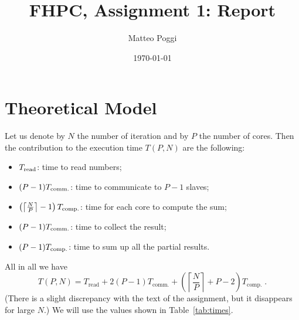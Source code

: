 \documentclass[11pt,a4paper]{article}
\title{FHPC, Assignment 1: Report}
\author{Matteo Poggi}
\date{\today}
\renewcommand{\l}{\left}
\renewcommand{\r}{\right}
\newcommand{\f}{\frac}
\newcommand{\mr}{\ensuremath{\mathrm}}
\numberwithin{equation}{section}
\begin{document}
\maketitle

\section{Theoretical Model}
Let us denote by $N$ the number of iteration and by $P$ the number of cores. Then the contribution to the execution time $T(P, N)$ are the following:
\begin{itemize}
    \item $T_{\mr{read}}$: time to read numbers;
    \item $(P-1)T_{\mr{comm.}}$: time to communicate to $P - 1$ slaves;
    \item $\l(\l\lceil\f{N}{P}\r\rceil - 1\r)T_{\mr{comp.}}$: time for each core to compute the sum;
    \item $(P-1)T_{\mr{comm.}}$: time to collect the result;
    \item $(P-1)T_{\mr{comp.}}$: time to sum up all the partial results.
\end{itemize}
All in all we have
\begin{equation}
    T(P, N) = T_{\text{read}} + 2(P-1)T_{\text{comm.}} + \left(\l\lceil\frac{N}{P}\r\rceil+P-2\right)T_{\text{comp.}}\;.
\end{equation}
(There is a slight discrepancy with the text of the assignment, but it disappears for large $N$.) We will use the values shown in Table~\ref{tab:times}.
\end{document}
